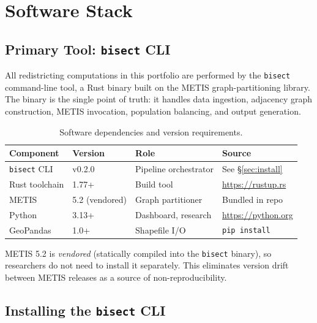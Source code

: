 
\section{Software Stack}
\label{sec:software}

\subsection*{Primary Tool: \texttt{bisect} CLI}

All redistricting computations in this portfolio are performed by the
\texttt{bisect} command-line tool, a Rust binary built on the METIS
graph-partitioning library.
The binary is the single point of truth: it handles data ingestion,
adjacency graph construction, METIS invocation, population balancing,
and output generation.

\begin{table}[h]
\centering
\caption{Software dependencies and version requirements.}
\label{tab:software}
\begin{tabular}{@{}llll@{}}
\toprule
Component & Version & Role & Source \\
\midrule
\texttt{bisect} CLI    & v0.2.0          & Pipeline orchestrator & See \S\ref{sec:install} \\
Rust toolchain         & 1.77+           & Build tool            & \url{https://rustup.rs} \\
METIS                  & 5.2 (vendored)  & Graph partitioner     & Bundled in repo \\
Python                 & 3.13+           & Dashboard, research   & \url{https://python.org} \\
GeoPandas              & 1.0+            & Shapefile I/O         & \texttt{pip install} \\
\bottomrule
\end{tabular}
\end{table}

\noindent METIS 5.2 is \emph{vendored} (statically compiled into the
\texttt{bisect} binary), so researchers do not need to install it separately.
This eliminates version drift between METIS releases as a source of
non-reproducibility.

\subsection*{Installing the \texttt{bisect} CLI}
\label{sec:install}

